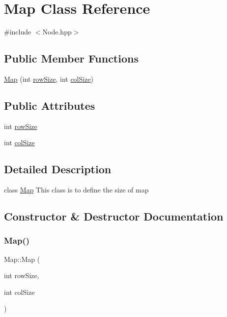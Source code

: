 \hypertarget{classMap}{}\section{Map Class Reference}
\label{classMap}


{\ttfamily \#include $<$Node.\+hpp$>$}

\subsection*{Public Member Functions}
\begin{DoxyCompactItemize}
\item 
\hyperlink{classMap_a72dbcd297b07e0f209cb009938c396a3}{Map} (int \hyperlink{classMap_af7183f407de3bb416713e41b804fa321}{row\+Size}, int \hyperlink{classMap_ac0a2c0d958ae3fcc86fbf52e561bc291}{col\+Size})
\end{DoxyCompactItemize}
\subsection*{Public Attributes}
\begin{DoxyCompactItemize}
\item 
int \hyperlink{classMap_af7183f407de3bb416713e41b804fa321}{row\+Size}
\item 
int \hyperlink{classMap_ac0a2c0d958ae3fcc86fbf52e561bc291}{col\+Size}
\end{DoxyCompactItemize}


\subsection{Detailed Description}
class \hyperlink{classMap}{Map} This class is to define the size of map 

\subsection{Constructor \& Destructor Documentation}
\mbox{\label{classMap_a72dbcd297b07e0f209cb009938c396a3}} 
\subsubsection{\texorpdfstring{Map()}{Map()}}
{\footnotesize\ttfamily Map\+::\+Map (\begin{DoxyParamCaption}\item[{int}]{row\+Size,  }\item[{int}]{col\+Size }\end{DoxyParamCaption})\hspace{0.3cm}{\ttfamily [inline]}}

